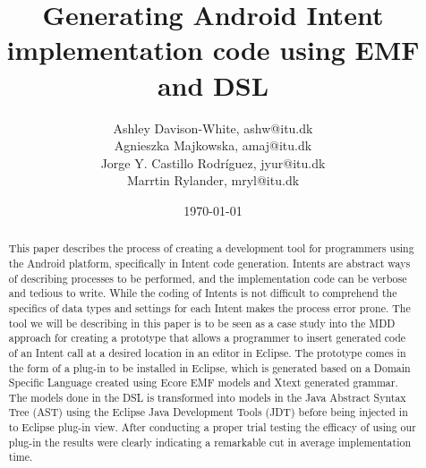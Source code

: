 \documentclass{llncs}
\title{Generating Android Intent implementation code using EMF and DSL}
\author{Ashley Davison-White, ashw@itu.dk 
      \\Agnieszka Majkowska, amaj@itu.dk
      \\Jorge Y. Castillo Rodríguez, jyur@itu.dk
      \\Marrtin Rylander, mryl@itu.dk}
\institute{IT University of Copenhagen}
\date{\today}
\begin{document}
\maketitle
\thispagestyle{plain}
\pagestyle{headings}
\setcounter{page}{1}

 \begin{abstract}
 This paper describes the process of creating a development tool for programmers using the Android platform, specifically in Intent code generation.
Intents are abstract ways of describing processes to be performed, and the implementation code can be verbose and tedious to write. While the coding of Intents is not difficult to comprehend the specifics of data types and settings for each Intent makes the process error prone. The tool we will be describing in this paper is to be seen as a case study into the MDD approach for creating a prototype that allows a programmer to insert generated code of an Intent call at a desired location in an editor in Eclipse. The prototype comes in the form of a plug-in to be installed in Eclipse, which is generated based on a Domain Specific Language created using Ecore EMF models and Xtext generated grammar.
 The models done in the DSL is transformed into models in the Java Abstract Syntax Tree (AST) using the Eclipse Java Development Tools (JDT) before being injected in to Eclipse plug-in view.
 After conducting a proper trial testing the efficacy of using our plug-in the results were clearly indicating a remarkable cut in average implementation time.    
 \end{abstract}




















\renewcommand{\bibname}{References}
\setlength{\bibsep}{0.0pt}


\end{document}
